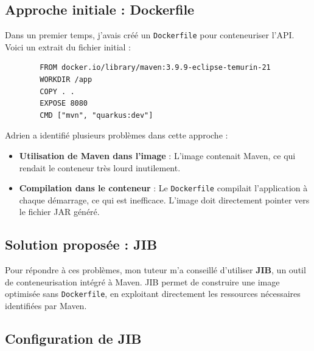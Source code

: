 \documentclass{article}
\begin{document}
	\subsection{Approche initiale : Dockerfile}
	
	Dans un premier temps, j'avais créé un \texttt{Dockerfile} pour conteneuriser l'API. Voici un extrait du fichier initial :
	
	\begin{verbatim}
		FROM docker.io/library/maven:3.9.9-eclipse-temurin-21
		WORKDIR /app
		COPY . .
		EXPOSE 8080
		CMD ["mvn", "quarkus:dev"]
	\end{verbatim}
	
	Adrien a identifié plusieurs problèmes dans cette approche :
	\begin{itemize}
		\item \textbf{Utilisation de Maven dans l'image} : L'image contenait Maven, ce qui rendait le conteneur très lourd inutilement.
		\item \textbf{Compilation dans le conteneur} : Le \texttt{Dockerfile} compilait l'application à chaque démarrage, ce qui est inefficace. L'image doit directement pointer vers le fichier JAR généré.
	\end{itemize}
	
	\subsection{Solution proposée : JIB}
	
	Pour répondre à ces problèmes, mon tuteur m'a conseillé d'utiliser \textbf{JIB}, un outil de conteneurisation intégré à Maven. JIB permet de construire une image optimisée sans \texttt{Dockerfile}, en exploitant directement les ressources nécessaires identifiées par Maven.
	
	\subsection{Configuration de JIB}
	
\end{document}
